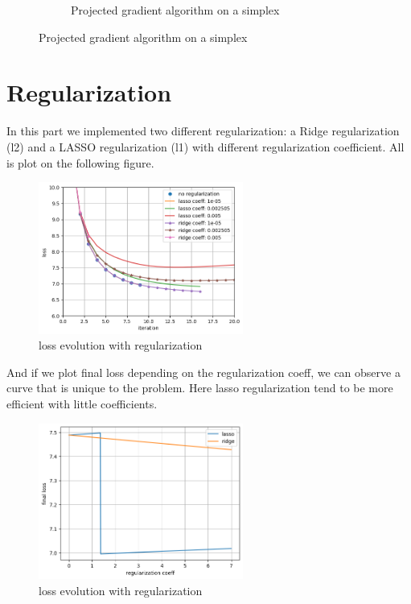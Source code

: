\documentclass{article}
\begin{document}
\begin{figure}[h!]
\begin{subfigure}{.5\textwidth}
            \caption{Projected gradient algorithm on a simplex}
            \label{fig:od}
        \end{subfigure}
    \end{figure}     

\section{Regularization}

    In this part we implemented two different regularization: a Ridge regularization (l2) and a LASSO regularization (l1) with different regularization coefficient. All is plot on the following figure.

    \begin{figure}[!h]
    \centering
    \includegraphics[width=0.6\textwidth]{images/part5.png}
    \caption{loss evolution with regularization}
    \label{fig:sg3}
    \end{figure}      

    And if we plot final loss depending on the regularization coeff, we can observe a curve that is unique to the problem. Here lasso regularization tend to be more efficient with little coefficients.

    \begin{figure}[!h]
    \centering
    \includegraphics[width=0.6\textwidth]{images/part5_2.png}
    \caption{loss evolution with regularization}
    \label{fig:sg3}
    \end{figure}          
    
\end{document}
